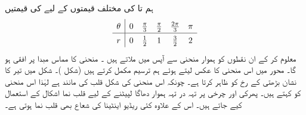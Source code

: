 ہم  تا  کی مختلف قیمتوں کے لیے   کی قیمتیں
\begin{align*}
\renewcommand{\arraystretch}{1.4}
\begin{array}{c|ccccc}
\theta&0&\tfrac{\pi}{3}&\tfrac{\pi}{2}&\tfrac{2\pi}{3}&\pi\\
\hline
r&0&\tfrac{1}{2}&1&\tfrac{3}{2}&2
\end{array}
\end{align*}
 معلوم کر کے ان نقطوں   کو  ہموار منحنی  سے  آپس میں ملاتے ہیں ۔  منحنی   کا مماس مبدا پر افقی ہو گا۔ محور  میں اس منحنی   کا عکس لیتے ہوئے ہم ترسیم مکمل کرتے ہیں (شکل )۔ شکل  میں تیر کا نشان بڑھتی  کے رخ کو ظاہر کرتا ہے۔ چونکہ اس منحنی کی شکل قلب کی مانند ہے لہٰذا اس منحنی کو  کہتے ہیں۔ پھرکی اور چرخی پر تہہ در تہہ ہموار دھاگا لپیٹنے کے لیے  قلب نما اشکال کے  استعمال کیے جاتے ہیں۔ اس کے علاوہ کئی ریڈیو اینٹینا کی شعاع بھی قلب نما ہوتی ہے۔ 
